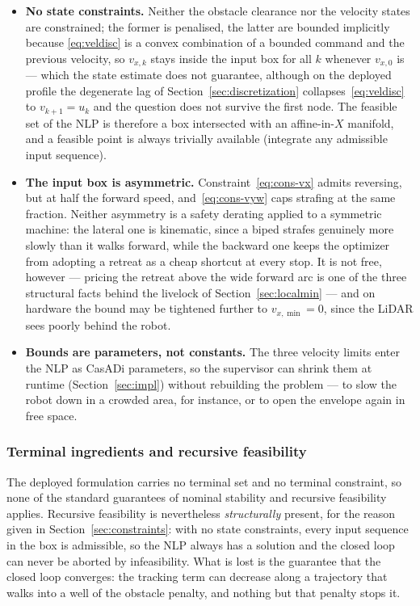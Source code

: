 \documentclass[11pt,a4paper]{article}
\begin{document}
\begin{itemize}
  \item \textbf{No state constraints.} Neither the obstacle clearance nor the velocity states are
        constrained; the former is penalised, the latter are bounded implicitly because
        \eqref{eq:veldisc} is a convex combination of a bounded command and the previous velocity, so
        $v_{x,k}$ stays inside the input box for all $k$ whenever $v_{x,0}$ is --- which the state
        estimate does not guarantee, although on the deployed profile the degenerate lag of
        Section~\ref{sec:discretization} collapses~\eqref{eq:veldisc} to $v_{k+1}=u_k$ and the question
        does not survive the first node. The feasible set of the NLP is therefore a box intersected with
        an affine-in-$X$ manifold, and a feasible point is always trivially available (integrate any
        admissible input sequence).
  \item \textbf{The input box is asymmetric.} Constraint~\eqref{eq:cons-vx} admits reversing, but at half
        the forward speed, and~\eqref{eq:cons-vyw} caps strafing at the same fraction. Neither asymmetry
        is a safety derating applied to a symmetric machine: the lateral one is kinematic, since a biped
        strafes genuinely more slowly than it walks forward, while the backward one keeps the optimizer
        from adopting a retreat as a cheap shortcut at every stop. It is not free, however --- pricing
        the retreat above the wide forward arc is one of the three structural facts behind the livelock
        of Section~\ref{sec:localmin} --- and on hardware the bound may be tightened further to
        $v_{x,\min}=0$, since the LiDAR sees poorly behind the robot.
  \item \textbf{Bounds are parameters, not constants.} The three velocity limits enter the NLP as CasADi
        parameters, so the supervisor can shrink them at runtime (Section~\ref{sec:impl}) without
        rebuilding the problem --- to slow the robot down in a crowded area, for instance, or to open the
        envelope again in free space.
\end{itemize}

\subsubsection{Terminal ingredients and recursive feasibility}
\label{sec:terminal}

The deployed formulation carries no terminal set and no terminal constraint, so none of the standard
guarantees of nominal stability and recursive feasibility \cite{mayne2000constrained,chen1998quasi} applies.
Recursive feasibility is nevertheless \emph{structurally} present, for the reason given in
Section~\ref{sec:constraints}: with no state constraints, every input sequence in the box is admissible, so
the NLP always has a solution and the closed loop can never be aborted by infeasibility. What is lost is the
guarantee that the closed loop converges: the tracking term can decrease along a trajectory that walks into
a well of the obstacle penalty, and nothing but that penalty stops it.
\end{document}
